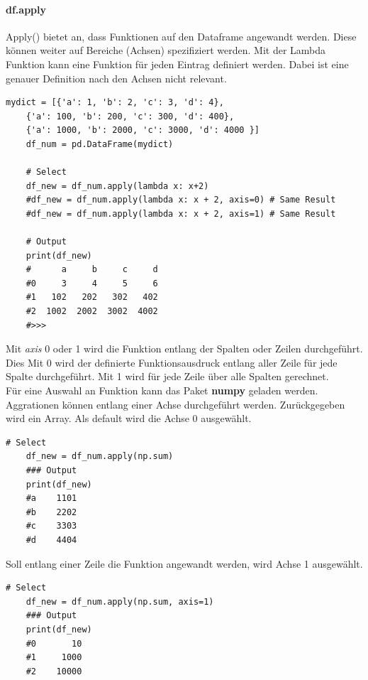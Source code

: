 \paragraph*{df.apply}
Apply() bietet an, dass Funktionen auf den Dataframe angewandt werden. Diese können weiter auf Bereiche (Achsen) spezifiziert werden.
Mit der Lambda Funktion kann eine Funktion für jeden Eintrag definiert werden. Dabei ist eine genauer Definition nach den Achsen nicht relevant.
\begin{lstlisting}[style=python]
	mydict = [{'a': 1, 'b': 2, 'c': 3, 'd': 4},
	{'a': 100, 'b': 200, 'c': 300, 'd': 400},          
	{'a': 1000, 'b': 2000, 'c': 3000, 'd': 4000 }]
	df_num = pd.DataFrame(mydict)
	
	# Select
	df_new = df_num.apply(lambda x: x+2)
	#df_new = df_num.apply(lambda x: x + 2, axis=0) # Same Result
	#df_new = df_num.apply(lambda x: x + 2, axis=1) # Same Result
	
	# Output
	print(df_new)
	#      a     b     c     d
	#0     3     4     5     6
	#1   102   202   302   402
	#2  1002  2002  3002  4002
	#>>> 
\end{lstlisting}
Mit \textit{axis} 0 oder 1 wird die Funktion entlang der Spalten oder Zeilen durchgeführt. Dies
Mit 0 wird der definierte Funktionsausdruck entlang aller Zeile für jede Spalte durchgeführt. Mit 1 wird für jede Zeile über alle Spalten gerechnet.\\
Für eine Auswahl an Funktion kann das Paket \textbf{numpy} geladen werden.\\

Aggrationen können entlang einer Achse durchgeführt werden. Zurückgegeben wird ein Array. Als default wird die Achse 0 ausgewählt.
\begin{lstlisting}[style=python]
	# Select
	df_new = df_num.apply(np.sum)
	### Output
	print(df_new)
	#a    1101
	#b    2202
	#c    3303
	#d    4404
\end{lstlisting}

Soll entlang einer Zeile die Funktion angewandt werden, wird Achse 1 ausgewählt.
\begin{lstlisting}[style=python]
	# Select
	df_new = df_num.apply(np.sum, axis=1)
	### Output
	print(df_new)
	#0       10
	#1     1000
	#2    10000
\end{lstlisting}

